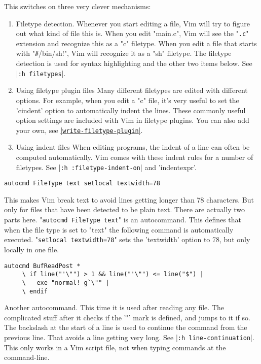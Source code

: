 This switches on three very clever mechanisms:
\begin{enumerate}
				\item Filetype detection.
								Whenever you start editing a file, Vim will try to figure out what kind of file this is.
								When you edit "main.c", Vim will see the "\verb!.c!" extension and recognize this as a "c" filetype.
								When you edit a file that starts with "\verb!#!/bin/sh!", Vim will recognize it as a "sh" filetype.
								The filetype detection is used for syntax highlighting and the other two items below.
								See |\verb!:h filetypes!|.

				\item Using filetype plugin files Many different filetypes are edited with different options.
								For example, when you edit a "c" file, it's very useful to set the 'cindent' option to automatically indent the lines.
								These commonly useful option settings are included with Vim in filetype plugins.
								You can also add your own, see \hyperref[write-filetype-plugin]{|\texttt{write-filetype-plugin}|}.

				\item Using indent files When editing programs, the indent of a line can often be computed automatically.
								Vim comes with these indent rules for a number of filetypes.
								See |\verb!:h :filetype-indent-on!| and 'indentexpr'.
\end{enumerate}

 \begin{Verbatim}[samepage=true]
 autocmd FileType text setlocal textwidth=78
 \end{Verbatim}

This makes Vim break text to avoid lines getting longer than 78 characters.
But only for files that have been detected to be plain text.
There are actually two parts here.
"\verb!autocmd FileType text!" is an autocommand.
This defines that when the file type is set to "text" the following command is automatically executed.
"\verb!setlocal textwidth=78!" sets the 'textwidth' option to 78, but only locally in one file.

\label{restore-cursor}

\begin{Verbatim}[samepage=true]
 autocmd BufReadPost *
     \ if line("'\"") > 1 && line("'\"") <= line("$") |
     \   exe "normal! g`\"" |
     \ endif
\end{Verbatim}

Another autocommand.
This time it is used after reading any file.
The complicated stuff after it checks if the '"' mark is defined, and jumps to it if so.
The backslash at the start of a line is used to continue the command from the previous line.
That avoids a line getting very long.
See |\verb!:h line-continuation!|.
This only works in a Vim script file, not when typing commands at the command-line.

